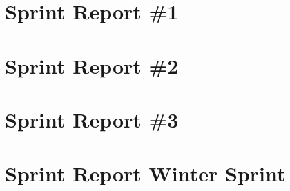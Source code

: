 

\section{Sprint Report \#1}



\section{Sprint Report \#2}



\section{Sprint Report \#3}



\section{Sprint Report Winter Sprint}



